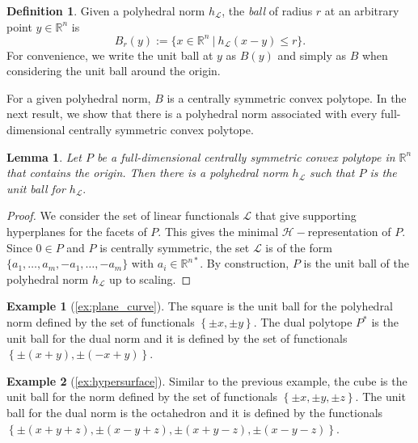 \documentclass{article}
\numberwithin{theorem}{section}
\newtheorem{lemma}[theorem]{Lemma}
\theoremstyle{definition}
\newtheorem{definition}[theorem]{Definition}
\theoremstyle{example_contd}
\newtheorem*{example_contd}{\hspace*{-0.45em}Example}
\newcommand{\RR}{\mathbb{R}}
\renewcommand{\L}{\mathcal{L}}
\begin{document}
\begin{definition}
	Given a polyhedral norm $h_{\L}$, the \textit{ball} of radius $r$ at an arbitrary point $y \in \RR^n$ is \[B_r(y):=\{x\in \RR^n~|~h_\L(x-y)\leq r\}.\] For convenience, we write the unit ball at $y$ as $B(y)$ and simply as $B$ when considering the unit ball around the origin. 
\end{definition}

For a given polyhedral norm, $B$ is a centrally symmetric convex polytope. 
In the next result, we show that there is a polyhedral norm associated with every full-dimensional centrally symmetric convex polytope.



\begin{lemma}
	Let $P$ be a full-dimensional centrally symmetric convex  polytope in $\RR^n$ that contains the origin. Then there is a polyhedral norm $h_\L$ such that $P$ is the unit ball for $h_\L.$
\end{lemma}

\begin{proof}
    We consider the set of linear functionals $\L$ that give supporting hyperplanes for the facets of $P$. This gives the minimal $\mathcal{H}-$representation of $P$. Since $0\in P$ and $P$ is centrally symmetric, the set $\L$ is of the form $\{a_1,\ldots, a_m,-a_1,\ldots,-a_m\}$ with $a_i\in\RR^{n*}$. By construction, $P$ is the unit ball of the polyhedral norm $h_\L$ up to scaling. 
\end{proof}





\begin{example_contd}[\ref{ex:plane_curve}]
	The square is the unit ball for the polyhedral norm defined by the set of functionals $\left\{\pm x, \pm y\right\}.$
	The dual polytope $P^{\ast}$ is the unit ball for the dual norm and it is defined by the set of functionals
	$ \left\{ \pm(x+y), \pm( -x+y)\right\}.$
\end{example_contd}

\begin{example_contd}[\ref{ex:hypersurface}]
	Similar to the previous example, the cube is the unit ball for the norm defined by the set of functionals
	$\left\{\pm x, \pm y,\pm z\right\}.$
	The unit ball for the dual norm is the octahedron and
	it is defined by the functionals 
	$
	\left\{\pm(x+y+z), \pm( x-y+z), \pm(x+y-z),\pm(x-y-z) \right\}.
$
\end{example_contd}
\end{document}
